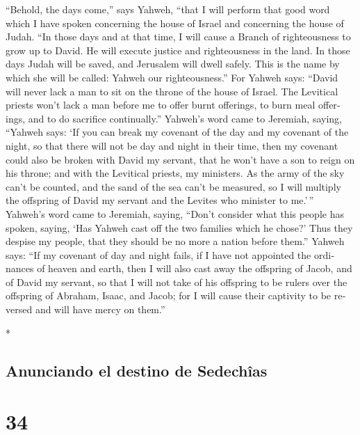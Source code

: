 \begin{paracol}{2}
\begin{otherlanguage}{english}
 ``Behold, the days come,'' says Yahweh, ``that I will
perform that good word which I have spoken concerning the house of
Israel and concerning the house of Judah.  ``In those
days and at that time, I will cause a Branch of righteousness to grow up
to David. He will execute justice and righteousness in the land.
 In those days Judah will be saved, and Jerusalem will
dwell safely. This is the name by which she will be called: Yahweh our
righteousness.''  For Yahweh says: ``David will never
lack a man to sit on the throne of the house of Israel. 
The Levitical priests won't lack a man before me to offer burnt
offerings, to burn meal offerings, and to do sacrifice continually.''
 Yahweh's word came to Jeremiah, saying, 
``Yahweh says: `If you can break my covenant of the day and my covenant
of the night, so that there will not be day and night in their time,
 then my covenant could also be broken with David my
servant, that he won't have a son to reign on his throne; and with the
Levitical priests, my ministers.  As the army of the sky
can't be counted, and the sand of the sea can't be measured, so I will
multiply the offspring of David my servant and the Levites who minister
to me.'\,''  Yahweh's word came to Jeremiah, saying,
 ``Don't consider what this people has spoken, saying,
`Has Yahweh cast off the two families which he chose?' Thus they despise
my people, that they should be no more a nation before them.''
 Yahweh says: ``If my covenant of day and night fails, if
I have not appointed the ordinances of heaven and earth, 
then I will also cast away the offspring of Jacob, and of David my
servant, so that I will not take of his offspring to be rulers over the
offspring of Abraham, Isaac, and Jacob; for I will cause their captivity
to be reversed and will have mercy on them.''

\end{otherlanguage}

\switchcolumn[0]*

\hypertarget{anunciando-el-destino-de-sedechuxeeas}{%
\subsection{Anunciando el destino de
Sedechîas}\label{anunciando-el-destino-de-sedechuxeeas}}

\hypertarget{section-66}{%
\section{34}\label{section-66}}


\end{paracol}
